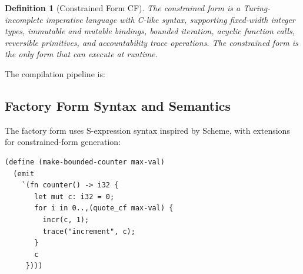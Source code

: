\documentclass[11pt,a4paper]{article}
\newtheorem{definition}[theorem]{Definition}
\newcommand{\cfform}{\textsf{CF}}
\newcommand{\ffform}{\textsf{FF}}
\begin{document}
\begin{definition}[Constrained Form \cfform{}]
The \emph{constrained form} is a Turing-incomplete imperative language with
C-like syntax, supporting fixed-width integer types, immutable and mutable
bindings, bounded iteration, acyclic function calls, reversible primitives,
and accountability trace operations.  The constrained form is the only form
that can execute at runtime.
\end{definition}

The compilation pipeline is:

\begin{center}
\end{center}

\subsection{Factory Form Syntax and Semantics}

The factory form uses S-expression syntax inspired by Scheme, with extensions
for constrained-form generation:

\begin{lstlisting}[language=oblibeny,caption={Factory form generating a bounded counter}]
(define (make-bounded-counter max-val)
  (emit
    `(fn counter() -> i32 {
       let mut c: i32 = 0;
       for i in 0..,(quote_cf max-val) {
         incr(c, 1);
         trace("increment", c);
       }
       c
     })))
\end{lstlisting}
\end{document}

